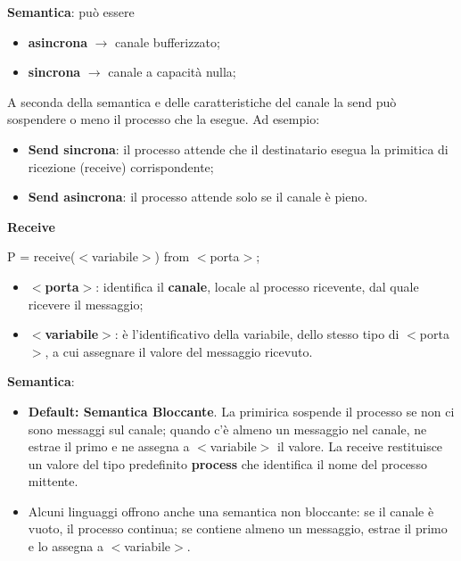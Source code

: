 \documentclass{article}
\begin{document}
\vspace{3mm}
\textbf{Semantica}: può essere
\begin{itemize}
    \item \textbf{asincrona} $\rightarrow$ canale bufferizzato;
    \item \textbf{sincrona} $\rightarrow$ canale a capacità nulla;
\end{itemize}

A seconda della semantica e delle caratteristiche del canale la send può sospendere o meno il processo che la esegue. Ad esempio:
\begin{itemize}
    \item \textbf{Send sincrona}: il processo attende che il destinatario esegua la primitica di ricezione (receive) corrispondente;
    \item \textbf{Send asincrona}: il processo attende solo se il canale è pieno.
\end{itemize}

\vspace{5mm}
\textbf{Receive}
\vspace{3mm}

\begin{center}
    P = receive($<$variabile$>$) from $<$porta$>$;
\end{center}

\begin{itemize}
    \item \textbf{$<$porta$>$}: identifica il \textbf{canale}, locale al processo ricevente, dal quale ricevere il messaggio;
    \item \textbf{$<$variabile$>$}: è l'identificativo della variabile, dello stesso tipo di $<$porta$>$, a cui assegnare il valore del messaggio ricevuto.
\end{itemize}

\vspace{3mm}
\textbf{Semantica}:
\begin{itemize}
    \item \textbf{Default: Semantica Bloccante}. La primirica sospende il processo se non ci sono messaggi sul canale; quando c'è almeno un messaggio nel canale, ne estrae il primo
        e ne assegna a $<$variabile$>$ il valore. La receive restituisce un valore del tipo predefinito \textbf{process} che identifica il nome del processo mittente.
    \item Alcuni linguaggi offrono anche una semantica non bloccante: se il canale è vuoto, il processo continua; se contiene almeno un messaggio, estrae il primo e lo assegna a
        $<$variabile$>$.
\end{itemize}
\end{document}
